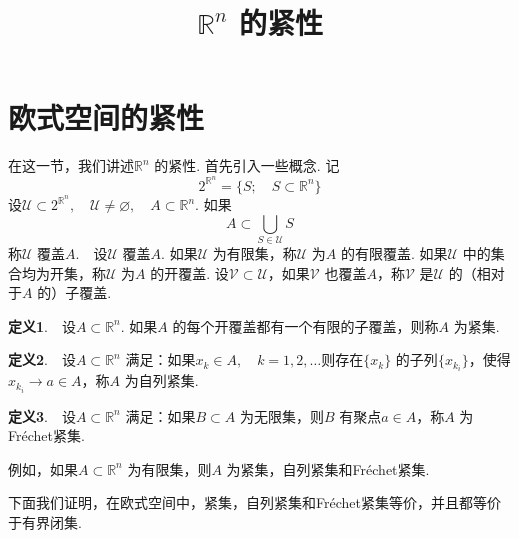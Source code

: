 \documentclass{article}
\title{\(\mathbb{R}^n\) 的紧性}
\author{}
\date{}
\begin{document}
\maketitle

\section{欧式空间的紧性}
在这一节，我们讲述\(\mathbb{R}^n\) 的紧性. 首先引入一些概念. 记
\begin{equation*}
    2^{\mathbb{R}^n} = \{S;\quad S \subset \mathbb{R}^n\}
\end{equation*}
设\(\mathcal{U} \subset 2^{\mathbb{R}^n},\quad \mathcal{U} \neq  \varnothing,\quad A \subset \mathbb{R}^n \). 如果
\begin{equation*}
    A \subset \bigcup_{S \in \mathcal{U}} S
\end{equation*}
称\(\mathcal{U}\) 覆盖\(A\).\ \ 设\(\mathcal{U}\) 覆盖\(A\). 如果\(\mathcal{U}\) 为有限集，称\(\mathcal{U}\) 为\(A\) 的有限覆盖. 如果\(\mathcal{U}\) 中的集合均为开集，称\(\mathcal{U}\) 为\(A\) 的开覆盖. 设\(\mathcal{V} \subset  \mathcal{U}\)，如果\(\mathcal{V}\) 也覆盖\(A\)，称\(\mathcal{V}\) 是\(\mathcal{U}\) 的（相对于\(A\) 的）子覆盖.

\vspace{20pt}

\textbf{定义1}.\ \ 设\(A \subset \mathbb{R}^n\). 如果\(A\) 的每个开覆盖都有一个有限的子覆盖，则称\(A\) 为紧集.

\vspace{10pt}

\textbf{定义2}.\ \ 设\(A \subset \mathbb{R}^n\) 满足：如果\(x_k \in A,\quad k = 1,2,\dots \)则存在\(\{x_k\} \) 的子列\(\{x_{k_i}\} \)，使得\(x_{k_i} \to a \in A\)，称\(A\) 为自列紧集.

\vspace{10pt}

\textbf{定义3}.\ \ 设\(A \subset \mathbb{R}^n\) 满足：如果\(B \subset A\) 为无限集，则\(B\) 有聚点\(a \in A\)，称\(A\) 为Fréchet紧集.


\vspace{20pt}

例如，如果\(A \subset \mathbb{R}^n\) 为有限集，则\(A\) 为紧集，自列紧集和Fréchet紧集.

\newpage

下面我们证明，在欧式空间中，紧集，自列紧集和Fréchet紧集等价，并且都等价于有界闭集.

\vspace{20pt}
\end{document}
